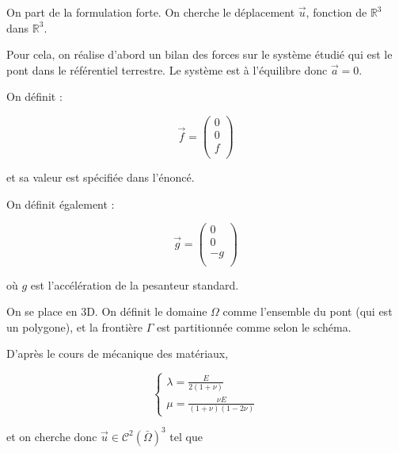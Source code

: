 On part de la formulation forte. On cherche le déplacement $\vec{u}$, fonction de $\mathbb{R}^3$ dans $\mathbb{R}^3$.

Pour cela, on réalise d'abord un bilan des forces sur le système étudié qui est le pont dans le référentiel terrestre. Le système est à l'équilibre donc $\vec{a} = 0$.

On définit :

\begin{equation}
    \vec{f} = \begin{pmatrix} 0\\ 0\\ f\\\end{pmatrix}
\end{equation}

et sa valeur est spécifiée dans l'énoncé.

On définit également :

\begin{equation}
    \vec{g} = \begin{pmatrix} 0\\ 0\\ -g\\\end{pmatrix}
\end{equation}

où $g$ est l'accélération de la pesanteur standard.

On se place en 3D. On définit le domaine $\Omega$ comme l'ensemble du pont (qui est un polygone), et la frontière $\Gamma$ est partitionnée comme selon le schéma.

D'après le cours de mécanique des matériaux,

\begin{equation}
    \begin{cases}
        \lambda = \frac{E}{2(1+\nu)}\\
        \mu = \frac{\nu E}{(1+\nu)(1-2\nu)}
    \end{cases}
\end{equation}

et on cherche donc $\vec{u} \in \mathcal{C}^2(\bar{\Omega})^3$ tel que

